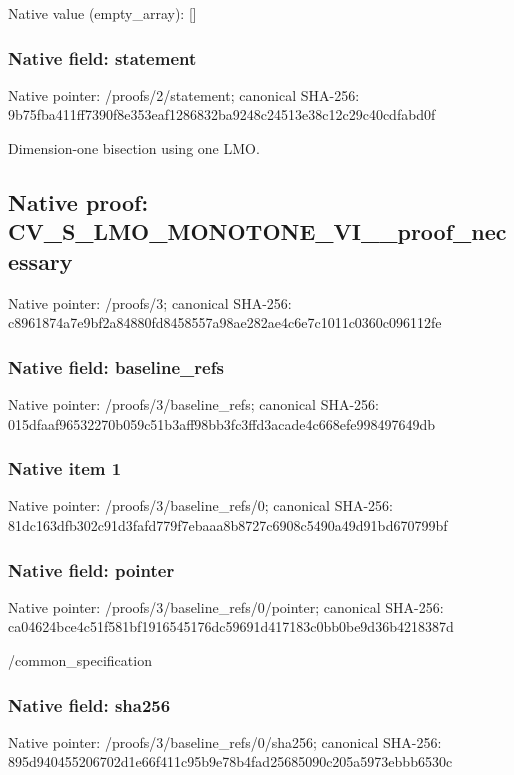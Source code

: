 \documentclass[10pt,a4paper]{article}
\begin{document}
Native value (empty\_\allowbreak{}array): []

\subsubsection{Native field: statement}
Native pointer: /proofs/2/statement; canonical SHA-256: 9b75fba411ff7390f8e353eaf1286832ba9248c24513e38c12c29c40cdfabd0f

\begingroup\raggedright\sloppy Dimension-one bisection using one LMO.\par\endgroup

\subsection{Native proof: CV\_\allowbreak{}S\_\allowbreak{}LMO\_\allowbreak{}MONOTONE\_\allowbreak{}VI\_\allowbreak{}\_\allowbreak{}proof\_\allowbreak{}necessary}
Native pointer: /proofs/3; canonical SHA-256: c8961874a7e9bf2a84880fd8458557a98ae282ae4c6e7c1011c0360c096112fe

\subsubsection{Native field: baseline\_\allowbreak{}refs}
Native pointer: /proofs/3/baseline\_\allowbreak{}refs; canonical SHA-256: 015dfaaf96532270b059c51b3aff98bb3fc3ffd3acade4c668efe998497649db

\subsubsection{Native item 1}
Native pointer: /proofs/3/baseline\_\allowbreak{}refs/0; canonical SHA-256: 81dc163dfb302c91d3fafd779f7ebaaa8b8727c6908c5490a49d91bd670799bf

\subsubsection{Native field: pointer}
Native pointer: /proofs/3/baseline\_\allowbreak{}refs/0/pointer; canonical SHA-256: ca04624bce4c51f581bf1916545176dc59691d417183c0bb0be9d36b4218387d

\begingroup\raggedright\sloppy /\allowbreak{}common\_\allowbreak{}specification\par\endgroup

\subsubsection{Native field: sha256}
Native pointer: /proofs/3/baseline\_\allowbreak{}refs/0/sha256; canonical SHA-256: 895d940455206702d1e66f411c95b9e78b4fad25685090c205a5973ebbb6530c
\end{document}

